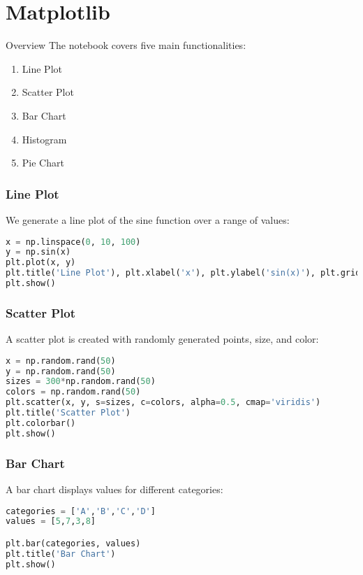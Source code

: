 \section{Matplotlib}

\begin{frame}[plain]
\sectionpage
\end{frame}


\begin{frame}{Overview}
The notebook covers five main functionalities:
\begin{enumerate}
\item Line Plot
\item Scatter Plot
\item Bar Chart
\item Histogram
\item Pie Chart
\end{enumerate}
\end{frame}



\begin{frame}[fragile]
\frametitle{Line Plot}
We generate a line plot of the sine function over a range of values:

\begin{lstlisting}[language=python]
x = np.linspace(0, 10, 100)
y = np.sin(x)
plt.plot(x, y)
plt.title('Line Plot'), plt.xlabel('x'), plt.ylabel('sin(x)'), plt.grid(True)
plt.show()
\end{lstlisting}
\end{frame}


\begin{frame}[fragile]
\frametitle{Scatter Plot}
A scatter plot is created with randomly generated points, size, and color:

\begin{lstlisting}[language=Python]
x = np.random.rand(50)
y = np.random.rand(50)
sizes = 300*np.random.rand(50)
colors = np.random.rand(50)
plt.scatter(x, y, s=sizes, c=colors, alpha=0.5, cmap='viridis')
plt.title('Scatter Plot')
plt.colorbar()
plt.show()
\end{lstlisting}
\end{frame}


\begin{frame}[fragile]
\frametitle{Bar Chart}
A bar chart displays values for different categories:

\begin{lstlisting}[language=Python]
categories = ['A','B','C','D']
values = [5,7,3,8]

plt.bar(categories, values)
plt.title('Bar Chart')
plt.show()
\end{lstlisting}
\end{frame}


